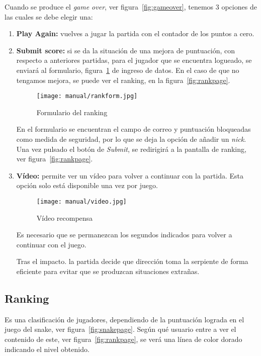 Cuando se produce el \emph{game over}, ver figura~\ref{fig:gameover}, tenemos 3 opciones de las cuales se debe elegir una:

\begin{enumerate}
	\item \textbf{Play Again:} vuelves a jugar la partida con el contador de los puntos a cero.
	\item \textbf{Submit score:} si se da la situación de una mejora de puntuación, con respecto a anteriores partidas, para el jugador que se encuentra logueado, se enviará al formulario, figura~\ref{fig:rankform} de ingreso de datos.
	En el caso de que no tengamos mejora, se puede ver el ranking, en la figura~\ref{fig:rankpage}.
	
	\begin{figure}[H]
		\centering
		\texttt{[image: manual/rankform.jpg]}
		\caption{Formulario del ranking}\label{fig:rankform}
	\end{figure}
	
	En el formulario se encuentran el campo de correo y puntuación bloqueadas como medida de seguridad, por lo que se deja la opción de añadir un \emph{nick}. Una vez pulsado el botón de \emph{Submit}, se redirigirá a la pantalla de ranking, ver figura~\ref{fig:rankpage}.
	
	\item \textbf{Vídeo:} permite ver un vídeo para volver a continuar con la partida. Esta opción solo está disponible una vez por juego.
	
		\begin{figure}[H]
		\centering
		\texttt{[image: manual/video.jpg]}
		\caption{Vídeo recompensa}\label{fig:video}
		\end{figure}
	
	Es necesario que se permanezcan los segundos indicados para volver a continuar con el juego. 
	
	Tras el impacto. la partida decide que dirección toma la serpiente de forma eficiente para evitar que se produzcan situaciones extrañas.
		
\end{enumerate}

\subsection{Ranking}\label{rank}
Es una clasificación de jugadores, dependiendo de la puntuación lograda en el juego del snake, ver figura~\ref{fig:snakepage}. Según qué usuario entre a ver el contenido de este, ver figura~\ref{fig:rankpage}, se verá una línea de color dorado indicando el nivel obtenido.

